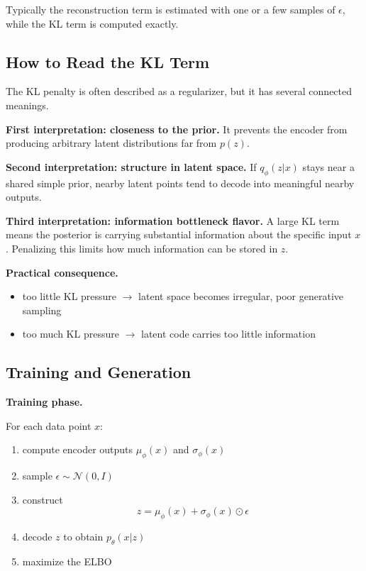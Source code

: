 \medskip

\noindent
Typically the reconstruction term is estimated with one or a few samples of $\epsilon$, while the KL term is computed exactly.

\subsection{How to Read the KL Term}

The KL penalty is often described as a regularizer, but it has several connected meanings.

\medskip

\noindent
\textbf{First interpretation: closeness to the prior.}  
It prevents the encoder from producing arbitrary latent distributions far from $p(z)$.

\medskip

\noindent
\textbf{Second interpretation: structure in latent space.}  
If $q_\phi(z|x)$ stays near a shared simple prior, nearby latent points tend to decode into meaningful nearby outputs.

\medskip

\noindent
\textbf{Third interpretation: information bottleneck flavor.}  
A large KL term means the posterior is carrying substantial information about the specific input $x$. Penalizing this limits how much information can be stored in $z$.

\medskip

\noindent
\textbf{Practical consequence.}

\begin{itemize}
    \item too little KL pressure $\rightarrow$ latent space becomes irregular, poor generative sampling
    \item too much KL pressure $\rightarrow$ latent code carries too little information
\end{itemize}

\subsection{Training and Generation}

\textbf{Training phase.}

For each data point $x$:
\begin{enumerate}
    \item compute encoder outputs $\mu_\phi(x)$ and $\sigma_\phi(x)$
    \item sample $\epsilon \sim \mathcal{N}(0,I)$
    \item construct
    \[
    z=\mu_\phi(x)+\sigma_\phi(x)\odot \epsilon
    \]
    \item decode $z$ to obtain $p_\theta(x|z)$
    \item maximize the ELBO
\end{enumerate}


